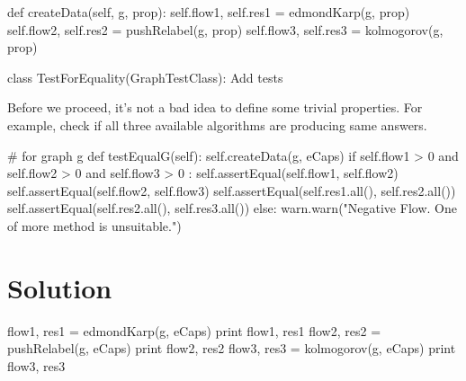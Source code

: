 \documentclass[10pt,a4paper]{article}%
\begin{document}
    def createData(self, g, prop):
        self.flow1, self.res1 = edmondKarp(g, prop)
        self.flow2, self.res2 = pushRelabel(g, prop)
        self.flow3, self.res3 = kolmogorov(g, prop)
 
class TestForEquality(GraphTestClass):
    \LA{}Add tests\RA{}

\eatline
\nwendcode{}\nwdocspar
\nwenddocs{}Before we proceed, it's not a bad idea to define some trivial properties. For
example, check if all three available algorithms are producing same answers.

\nwenddocs{}\endmoddef\nwstartdeflinemarkup\nwenddeflinemarkup
# for graph g
def testEqualG(self):
    self.createData(g, eCaps)
    if self.flow1 > 0 and self.flow2 > 0 and self.flow3 > 0 : 
        self.assertEqual(self.flow1, self.flow2)
        self.assertEqual(self.flow2, self.flow3)
        self.assertEqual(self.res1.all(), self.res2.all())
        self.assertEqual(self.res2.all(), self.res3.all())
    else:
        warn.warn("Negative Flow. One of more method is unsuitable.")
\nwendcode{}\section{Solution}
\nwenddocs{}\plusendmoddef\nwstartdeflinemarkup\nwenddeflinemarkup
flow1, res1 = edmondKarp(g, eCaps)
print flow1, res1
flow2, res2 = pushRelabel(g, eCaps)
print flow2, res2
flow3, res3 = kolmogorov(g, eCaps)
print flow3, res3
\nwendcode{}\nwdocspar
\end{document}
